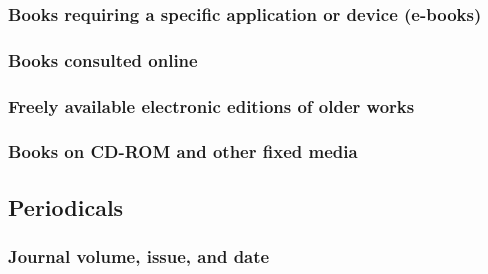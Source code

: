 \documentclass[11pt,letterpaper,oneside]{article}
\begin{document}
\subsubsection{Books requiring a specific application or device (e-books)}

\begin{citebib}
\item \cite{borel2015}
\end{citebib}

\setcounter{subsubsection}{160}
\subsubsection{Books consulted online}

\begin{citebib}
\item \cite[59]{lystra2004}
\item \cite[60--61]{lystra2004}
\end{citebib}

\subsubsection{Freely available electronic editions of older works}

\begin{citebib}
\item \cite{james2008}
\end{citebib}

\subsubsection{Books on CD-ROM and other fixed media}

\begin{citebib}
\item \cite[1.4]{chicago2003}
\end{citebib}

\setcounter{subsection}{5}
\subsection{Periodicals}
\setcounter{subsection}{14}

\setcounter{subsubsection}{170}
\subsubsection{Journal volume, issue, and date}
\end{document}
